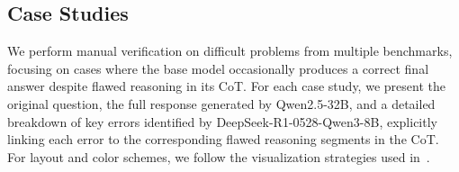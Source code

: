 \newpage

\subsection{Case Studies}
\label{supp_sec:all_case_study}


We perform manual verification on difficult problems from multiple benchmarks, focusing on cases where the base model occasionally produces a correct final answer despite flawed reasoning in its CoT. 
For each case study, we present the original question, the full response generated by Qwen2.5-32B, and a detailed breakdown of key errors identified by DeepSeek-R1-0528-Qwen3-8B, explicitly linking each error to the corresponding flawed reasoning segments in the CoT. 
For layout and color schemes, we follow the visualization strategies used in~\citet{yue2025RLVR_limit}.







% 